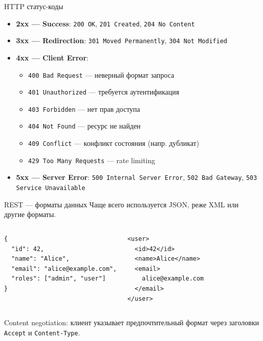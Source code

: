 \documentclass{beamer}
\begin{document}
\begin{frame}{HTTP статус-коды}
\begin{itemize}
  \item \textbf{2xx --- Success}: \texttt{200 OK}, \texttt{201 Created}, \texttt{204 No Content}
  \item \textbf{3xx --- Redirection}: \texttt{301 Moved Permanently}, \texttt{304 Not Modified}
  \item \textbf{4xx --- Client Error}:
  \begin{itemize}
    \item \texttt{400 Bad Request} --- неверный формат запроса
    \item \texttt{401 Unauthorized} --- требуется аутентификация
    \item \texttt{403 Forbidden} --- нет прав доступа
    \item \texttt{404 Not Found} --- ресурс не найден
    \item \texttt{409 Conflict} --- конфликт состояния (напр. дубликат)
    \item \texttt{429 Too Many Requests} --- rate limiting
  \end{itemize}
  \item \textbf{5xx --- Server Error}: \texttt{500 Internal Server Error}, \texttt{502 Bad Gateway}, \texttt{503 Service Unavailable}
\end{itemize}
\end{frame}

\begin{frame}[fragile]{REST --- форматы данных}
Чаще всего используется JSON, реже XML или другие форматы.
\begin{columns}
\begin{verbatim}
{
  "id": 42,
  "name": "Alice",
  "email": "alice@example.com",
  "roles": ["admin", "user"]
}
\end{verbatim}
\begin{verbatim}
<user>
  <id>42</id>
  <name>Alice</name>
  <email>
    alice@example.com
  </email>
</user>
\end{verbatim}
\end{columns}
\vspace{0.3cm}
Content negotiation: клиент указывает предпочтительный формат через заголовки \texttt{Accept} и \texttt{Content-Type}.
\end{frame}
\end{document}
